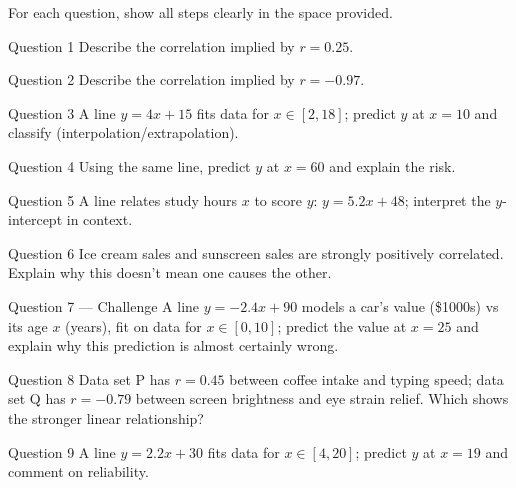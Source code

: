 \documentclass[11pt]{article}
\begin{document}
\clearpage
{}
For each question, show all steps clearly in the space provided.

\begin{qbox}{Question 1}
Describe the correlation implied by $r=0.25$.\workspace{2.4cm}
\end{qbox}

\begin{qbox}{Question 2}
Describe the correlation implied by $r=-0.97$.\workspace{2.4cm}
\end{qbox}

\begin{qbox}{Question 3}
A line $y=4x+15$ fits data for $x\in[2,18]$; predict $y$ at $x=10$ and classify (interpolation/extrapolation).\workspace{2.4cm}
\end{qbox}

\begin{qbox}{Question 4}
Using the same line, predict $y$ at $x=60$ and explain the risk.\workspace{2.4cm}
\end{qbox}

\begin{qbox}{Question 5}
A line relates study hours $x$ to score $y$: $y=5.2x+48$; interpret the $y$-intercept in context.\workspace{2.4cm}
\end{qbox}

\begin{qbox}{Question 6}
Ice cream sales and sunscreen sales are strongly positively correlated. Explain why this doesn't mean one causes the other.\workspace{2.4cm}
\end{qbox}

\begin{qbox}{Question 7 --- Challenge}
A line $y=-2.4x+90$ models a car's value (\$1000s) vs its age $x$ (years), fit on data for $x\in[0,10]$; predict the value at $x=25$ and explain why this prediction is almost certainly wrong.\workspace{3.4cm}
\end{qbox}

\begin{qbox}{Question 8}
Data set P has $r=0.45$ between coffee intake and typing speed; data set Q has $r=-0.79$ between screen brightness and eye strain relief. Which shows the stronger linear relationship?\workspace{2.4cm}
\end{qbox}

\begin{qbox}{Question 9}
A line $y=2.2x+30$ fits data for $x\in[4,20]$; predict $y$ at $x=19$ and comment on reliability.\workspace{2.4cm}
\end{qbox}
\end{document}

